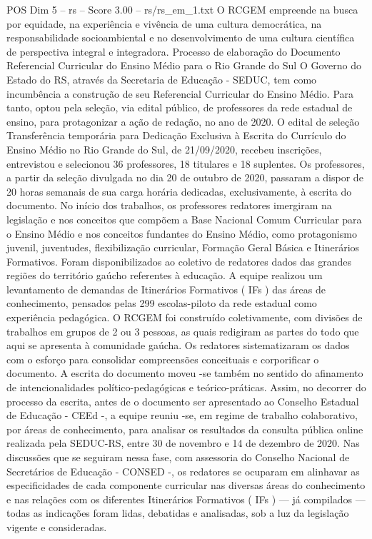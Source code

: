 \begin{textsample}{POS Dim 5 – rs – Score 3.00 – rs/rs\_em\_1.txt}
O RCGEM empreende na busca por equidade, na experiência e vivência de uma cultura democrática, na responsabilidade socioambiental e no desenvolvimento de uma cultura científica de perspectiva integral e integradora.
Processo de elaboração do Documento Referencial Curricular do Ensino Médio para o Rio Grande do Sul O Governo do Estado do RS, através da Secretaria de Educação - SEDUC, tem como incumbência a construção de seu Referencial Curricular do Ensino Médio.
Para tanto, optou pela seleção, via edital público, de professores da rede estadual de ensino, para protagonizar a ação de redação, no ano de 2020.
O edital de seleção Transferência temporária para Dedicação Exclusiva à Escrita do Currículo do Ensino Médio no Rio Grande do Sul, de 21/09/2020, recebeu inscrições, entrevistou e selecionou 36 professores, 18 titulares e 18 suplentes.
Os professores, a partir da seleção divulgada no dia 20 de outubro de 2020, passaram a dispor de 20 horas semanais de sua carga horária dedicadas, exclusivamente, à escrita do documento.
No início dos trabalhos, os professores redatores imergiram na legislação e nos conceitos que compõem a Base Nacional Comum Curricular para o Ensino Médio e nos conceitos fundantes do Ensino Médio, como protagonismo juvenil, juventudes, flexibilização curricular, Formação Geral Básica e Itinerários Formativos.
Foram disponibilizados ao coletivo de redatores dados das grandes regiões do território gaúcho referentes à educação.
A equipe realizou um levantamento de demandas de Itinerários Formativos ( IFs ) das áreas de conhecimento, pensados pelas 299 escolas-piloto da rede estadual como experiência pedagógica.
O RCGEM foi construído coletivamente, com divisões de trabalhos em grupos de 2 ou 3 pessoas, as quais redigiram as partes do todo que aqui se apresenta à comunidade gaúcha.
Os redatores sistematizaram os dados com o esforço para consolidar compreensões conceituais e corporificar o documento.
A escrita do documento moveu -se também no sentido do afinamento de intencionalidades político-pedagógicas e teórico-práticas.
Assim, no decorrer do processo da escrita, antes de o documento ser apresentado ao Conselho Estadual de Educação - CEEd -, a equipe reuniu -se, em regime de trabalho colaborativo, por áreas de conhecimento, para analisar os resultados da consulta pública online realizada pela SEDUC-RS, entre 30 de novembro e 14 de dezembro de 2020.
Nas discussões que se seguiram nessa fase, com assessoria do Conselho Nacional de Secretários de Educação - CONSED -, os redatores se ocuparam em alinhavar as especificidades de cada componente curricular nas diversas áreas do conhecimento e nas relações com os diferentes Itinerários Formativos ( IFs ) — já compilados — todas as indicações foram lidas, debatidas e analisadas, sob a luz da legislação vigente e consideradas.

\end{textsample}
